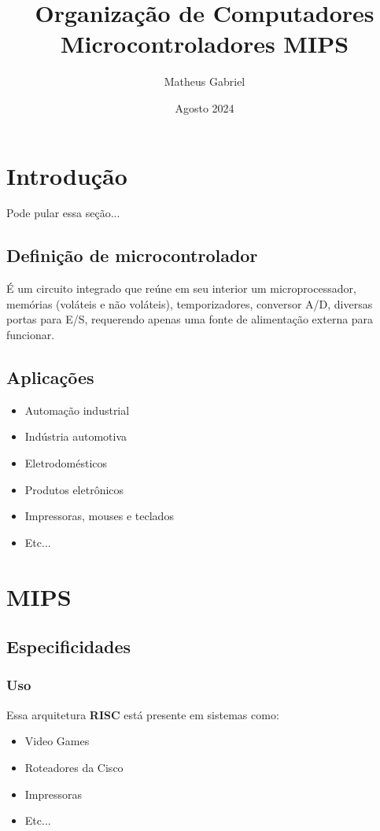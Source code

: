\documentclass{article}
\title{Organização de Computadores \\
    \large Microcontroladores MIPS}
\author{Matheus Gabriel}
\date{Agosto 2024}
\begin{document}
\maketitle

\section{Introdução}

\begin{tcolorbox}[colback=blue!10, colframe=blue!80, title=Seção menos importante, fonttitle=\bfseries]
    Pode pular essa seção...
\end{tcolorbox}

\subsection{Definição de microcontrolador}

É um circuito integrado que reúne em seu interior um
microprocessador, memórias (voláteis e não voláteis),
temporizadores, conversor A/D, diversas portas para E/S,
requerendo apenas uma fonte de alimentação externa para
funcionar.

\subsection{Aplicações}

\begin{itemize}
    \item Automação industrial
    \item Indústria automotiva
    \item Eletrodomésticos
    \item Produtos eletrônicos
    \item Impressoras, mouses e teclados
    \item Etc...
\end{itemize}

\clearpage

\section{MIPS}
\subsection{Especificidades}
\subsubsection{Uso}
Essa arquitetura \textbf{RISC} está presente em sistemas como:
\begin{itemize}
    \item Video Games
    \item Roteadores da Cisco
    \item Impressoras
    \item Etc...
\end{itemize}
\end{document}

